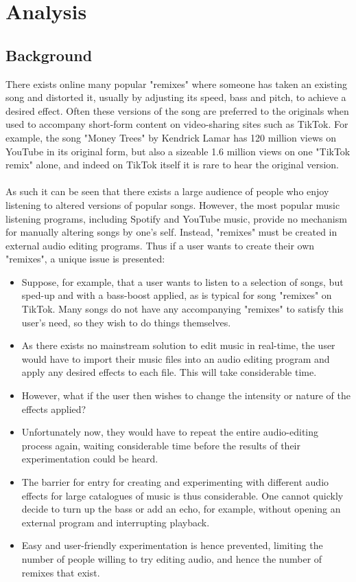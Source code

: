 \section{Analysis}

\subsection{Background}
There exists online many popular "remixes"  where someone has taken an existing song and distorted it, usually by adjusting its speed, bass and pitch, to achieve a desired effect. Often these versions of the song are preferred to the originals when used to accompany short-form content on video-sharing sites such as TikTok. For example,  the song "Money Trees" by Kendrick Lamar has 120 million views on YouTube  in its original form, but also a sizeable 1.6 million views on one "TikTok remix" alone, and indeed on TikTok itself it is rare to hear the original version.

\paragraph{}
As such it can be seen that there exists a large audience of people who enjoy listening to altered versions of popular songs. However, the most popular music listening programs, including Spotify and YouTube music, provide no mechanism for manually altering songs by one's self. Instead, "remixes" must be created in external audio editing programs. Thus if a user wants to create their own "remixes", a unique issue is presented:
\begin{itemize}
	\item Suppose, for example, that a user wants to listen to a selection of songs, but sped-up and with a bass-boost applied, as is typical for song "remixes" on TikTok. Many songs do not have any accompanying "remixes" to satisfy this user's need, so they wish to do things themselves.
	\item As there exists no mainstream solution to edit music in real-time, the user would have to import their music files into an audio editing program and apply any desired effects to each file. This will take considerable time.
	\item However, what if the user then wishes to change the intensity or nature of the effects applied?
	\item Unfortunately now, they would have to repeat the entire audio-editing process again, waiting considerable time before the results of their experimentation could be heard.
	\item The barrier for entry for creating and experimenting with different audio effects for large catalogues of music is thus considerable. One cannot quickly decide to turn up the bass or add an echo, for example, without opening an external program and interrupting playback.
	\item Easy and user-friendly experimentation is hence prevented, limiting the number of people willing to try editing audio, and hence the number of remixes that exist.
\end{itemize}

